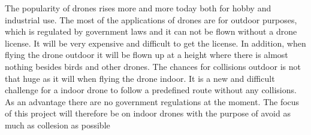 The popularity of drones rises more and more today both for hobby and industrial use. The most of the applications of drones are for outdoor purposes, which is regulated by government laws and it can not be flown without a drone license.  It will be very expensive and difficult to get the license. In addition, when flying the drone outdoor it will be flown up at a height where there is almost nothing besides birds and other drones. The chances for collisions outdoor is not that huge as it will when flying the drone indoor.  
It is a new and difficult challenge for a indoor drone to follow a predefined route without any collisions. As an advantage there are no government regulations at the moment. The focus of this project will therefore be on indoor drones with the purpose of avoid as much as collesion as possible


